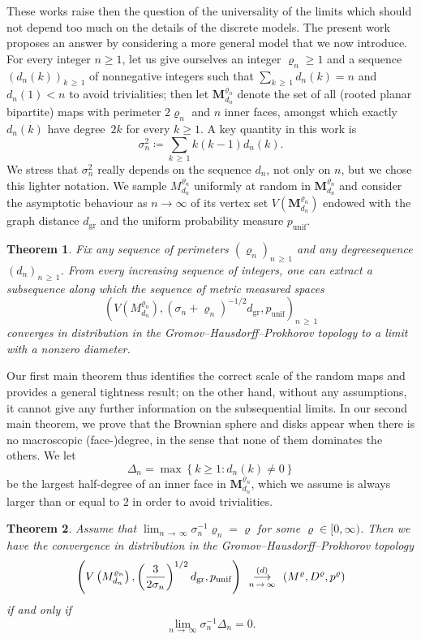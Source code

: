\documentclass[10pt]{amsart}
\newtheorem{theo}{Theorem}[section]
\theoremstyle{definition}\newtheorem{defi}[theo]{Definition}\newtheorem{rema}[theo]{Remark}\newtheorem{exam}[theo]{Example}\newtheorem{exem}[theo]{Example}\newtheorem{nota}[theo]{Notation}
\newcommand{\1}{\ensembles{1}}
\newcommand{\Map}{\mathbf{M}}
\renewcommand{\ge}{\geqslant}
\newcommand{\Bmap}{M}
\newcommand{\dBmap}{D}
\newcommand{\pBmap}{p}
\newcommand{\Mn}{\Map_{d_n}^{\varrho_n}}
\newcommand{\mn}{M_{d_n}^{\varrho_n}}
\newcommand{\dgr}{d_{\mathrm{gr}}}
\newcommand{\pgr}{p_{\mathrm{unif}}}
\newcommand{\Vmn}{V(M_{d_n}^{\varrho_n})}
\newcommand{\cvloi}[1][n]{\enskip\mathop{\longrightarrow}^{(d)}_{#1\,\to\, \infty}\enskip}
\providecommand{\?}{}
\begin{document}
These works raise then the question of the universality of the limits which should not depend too much on the details of the discrete models. The present work proposes an answer by considering a more general model that we now introduce. For every integer $n \ge 1$, let us give ourselves an integer $\varrho_n \ge 1$ and a sequence $(d_n(k))_{k \,\ge\,1}$ of nonnegative integers such that $\sum_{k\,\ge\,1} d_n(k) = n$ and $d_n(1) < n$ to avoid trivialities; then let $\Mn$ denote the set of all (rooted planar bipartite) maps with perimeter $2 \varrho_n$ and $n$ inner faces, amongst which exactly $d_n(k)$ have degree~$2k$ for every $k \ge 1$. A key quantity in this work is
\[
\sigma_n^2 \coloneqq \sum_{k\,\ge\,1} k (k-1) d_n(k).
\]
We stress that $\sigma_n^2$ really depends on the sequence $d_{n}$, not only on $n$, but we chose this lighter notation. We sample $\mn$ uniformly at random in $\Mn$ and consider the asymptotic behaviour as $n \to \infty$ of its vertex set $V(\Mn)$ endowed with the graph distance $\dgr$ and the uniform probability measure $\pgr$.


\begin{theo}\label{thm:tension_cartes}
Fix any sequence of perimeters $(\varrho_n)_{n\,\ge\,1}$ and any degree\linebreak sequence $(d_n)_{n\,\ge\,1}$. From every increasing sequence of integers, one can extract a subsequence along which the sequence of metric measured spaces
\[
\left(\Vmn, \left(\sigma_n + \varrho_n\right)^{-1/2} \dgr, \pgr\right)_{n\,\ge\,1}
\]
converges in distribution in the Gromov--Hausdorff--Prokhorov topology to a limit with a nonzero diameter.
\end{theo}



Our first main theorem thus identifies the correct scale of the random maps and provides a general tightness result; on the other hand, without any assumptions, it cannot give any further information on the subsequential limits. In our second main theorem, we prove that the Brownian sphere and disks appear when there is no macroscopic (face-)degree, in the sense that none of them dominates the others. We let
\[
\Delta_n = \max\left\{k \ge 1 : d_n(k) \ne 0\right\}
\]
be the largest half-degree of an inner face in $\Mn$, which we assume is always larger than or equal to $2$ in order to avoid trivialities.


\begin{theo}\label{thm:convergence_carte_disque}
Assume that $\lim_{n\,\to\,\infty} \sigma_n^{-1} \varrho_n = \varrho$ for some $\varrho \in [0,\infty)$. Then we have the convergence in distribution in the Gromov--Hausdorff--Prokhorov topology
\[
\left(V\left(\mn\right), \left(\frac{3}{2 \sigma_n}\right)^{1/2} \dgr, \pgr\right) \cvloi \left(\Bmap^\varrho,\dBmap^\varrho, \pBmap^\varrho\right)
\]
if and only if
\[
\lim_{n\,\to\,\infty} \sigma_n^{-1} \Delta_n = 0.
\]
\end{theo}
\end{document}
